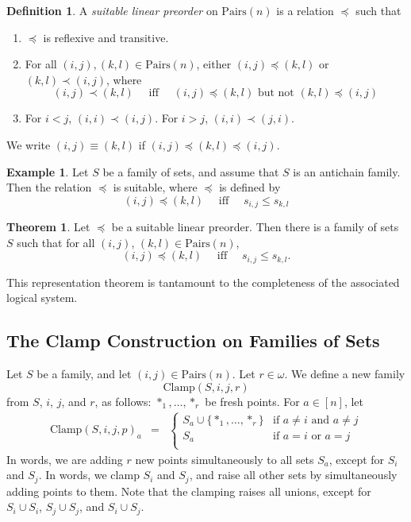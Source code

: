 \documentclass[12pt]{article}
\theoremstyle{definition}
\newtheorem{definition}{Definition}
\newtheorem{theorem}{Theorem}
\newtheorem{example}{Example}
\newcommand{\set}[1]{\{ #1 \}}
\newcommand{\quadiff}{\quad \mbox{ iff } \quad}
\newcommand{\Pairs}{\mbox{Pairs}}
\newcommand{\Clamp}{\mbox{Clamp}}
\begin{document}
\begin{definition}\label{def-suitable}
A \emph{suitable linear preorder} on $\Pairs(n)$
is a relation $\preceq$ such that
\begin{enumerate}
    \item $\preceq$ is reflexive and transitive.
    \item For all $(i,j), (k,l)\in \Pairs(n)$,
 either $(i,j) \preceq (k,l)$ or $(k,l) \prec (i,j)$,
 where 
 \[ (i,j) \prec(k,l) \quadiff  (i,j) \preceq (k,l) \mbox{ but not } (k,l)\preceq (i,j)
 \]
    \item For $i < j$, $(i,i) \prec (i,j)$.
    For $i > j$, $(i,i) \prec (j,i)$.
 \end{enumerate}
We write $(i,j)\equiv (k,l)$ if
$(i,j)\preceq (k,l) \preceq (i,j)$.
\end{definition}

\begin{example} Let  $S$  be a family of sets,
and assume that $S$ is an antichain family.
Then the relation 
$\preceq$ is suitable, where $\preceq$ is defined by 
\[ (i,j) \preceq (k,l) \quadiff s_{i,j} \leq s_{k,l}
\]
\label{example-suitable}
\end{example}




\begin{theorem}
Let $\preceq$ be a suitable linear preorder.
Then there is a family of sets $S$
such that for all $(i,j)$, $(k,l)\in\Pairs(n)$,
\begin{equation}
    \label{goal}
 (i,j) \preceq  (k,l) \quadiff 
 s_{i,j}\leq s_{k,l}.
 \end{equation}
 \label{theorem-thoughts}
 \end{theorem}
 
 This representation theorem is tantamount to the completeness of the
 associated logical system.
 
\subsection{The Clamp Construction on Families of Sets}
 Let $S$ be a  family,
 and let $(i,j)\in\Pairs(n)$.
 Let $r\in \omega$.
 We define a new family 
 \[ \Clamp(S,i,j,r)\]
 from $S$, $i$, $j$, and $r$, as follows:
$*_1,\ldots, *_r$ be   fresh points.
For $a\in[n]$, let 
\[ \begin{array}{lcl}
\Clamp(S,i,j,p)_a & = & \left\{
\begin{array}{ll}
S_a \cup \set{*_1,\ldots, *_r} & \mbox{if $a\neq i$ and $a\neq j$}\\
 S_a & \mbox{if $a= i$ or $a = j$}\\
 \end{array}
 \right.
\end{array}
\]
In words, we are adding $r$ new points
simultaneously to all sets $S_a$, except
for $S_i$ and $S_j$.  In words, we clamp $S_i$ and $S_j$, and raise all other sets
by simultaneously adding points to them.    Note that the clamping raises all unions,
except for $S_i\cup S_i$, $S_j \cup S_j$, and $S_i\cup S_j$.
\end{document}
